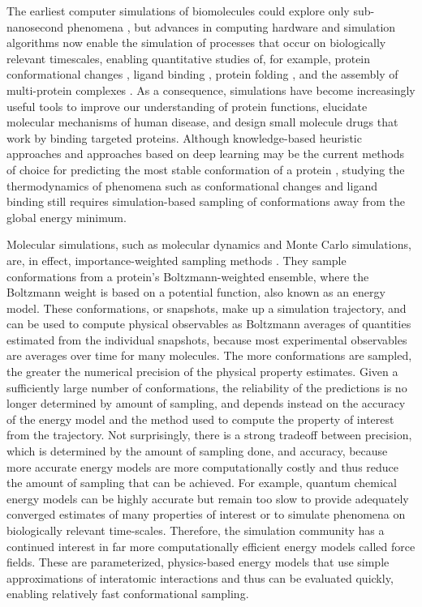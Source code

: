 \documentclass[9pt,review]{livecoms}
\begin{document}
The earliest computer simulations of biomolecules could explore only sub-nanosecond phenomena \cite{mccammon_dynamics_1977,case_dynamics_1979,levitt_accurate_1988}, but advances in computing hardware \cite{stone_accelerating_2007,shaw_anton_2008} and simulation algorithms \cite{darden_particle_1993,wennberg_direct-space_2015} now enable the simulation of processes that occur on biologically relevant timescales, enabling quantitative studies of, for example, protein conformational changes \cite{grant_large_2010,anandakrishnan_speed_2015}, ligand binding \cite{gilson_calculation_2007,wang_identifying_2013,reif_net_2014}, protein folding \cite{lindorff-larsen_how_2011,shaw_atomic-level_2010}, and the assembly of multi-protein complexes \cite{ssaglam_proteinprotein_2019}.
As a consequence, simulations have become increasingly useful tools to improve our understanding of protein functions, elucidate molecular mechanisms of human disease, and design small molecule drugs that work by binding targeted proteins.
Although knowledge-based heuristic approaches\cite{rohl_protein_2004} and approaches based on deep learning \cite{jumper_highly_2021} may be the current methods of choice for predicting the most stable conformation of a protein \cite{kryshtafovych_critical_2021}, studying the thermodynamics of phenomena such as conformational changes and ligand binding still requires simulation-based sampling of conformations away from the global energy minimum.

Molecular simulations, such as molecular dynamics and Monte Carlo simulations, are, in effect, importance-weighted sampling methods \cite{frenkel_understanding_2001}.
They sample conformations from a protein’s Boltzmann-weighted ensemble, where the Boltzmann weight is based on a potential function, also known as an energy model.
These conformations, or snapshots, make up a simulation trajectory, and can be used to compute physical observables as Boltzmann averages of quantities estimated from the individual snapshots, because most experimental observables are averages over time for many molecules. The more conformations are sampled, the greater the numerical precision of the physical property estimates.
Given a sufficiently large number of conformations, the reliability of the predictions is no longer determined by amount of sampling, and depends instead on the accuracy of the energy model and the method used to compute the property of interest from the trajectory.
Not surprisingly, there is a strong tradeoff between precision, which is determined by the amount of sampling done, and accuracy, because more accurate energy models are more computationally costly and thus reduce the amount of sampling that can be achieved.
For example, quantum chemical energy models can be highly accurate but remain too slow to provide adequately converged estimates of many properties of interest or to simulate phenomena on biologically relevant time-scales.
Therefore, the simulation community has a continued interest in far more computationally efficient energy models called force fields.
These are parameterized, physics-based energy models that use simple approximations of interatomic interactions and thus can be evaluated quickly, enabling relatively fast conformational sampling.
\end{document}
